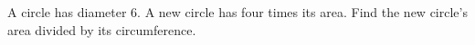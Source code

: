 A circle has diameter $6$. A new circle has four times its area. Find the new circle's area divided by its circumference.
